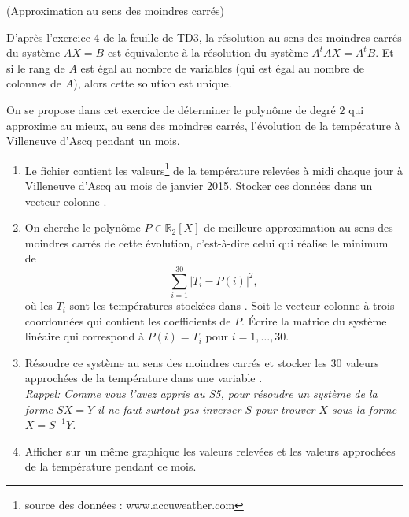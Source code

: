 \documentclass[a4paper,12pt,reqno]{amsart}
\begin{document}
\begin{exo} (Approximation au sens des moindres carrés)

  D'après l'exercice 4 de la feuille de TD3, la résolution au sens des moindres carrés du système $AX=B$ est équivalente à la résolution du système $A^{t}AX=A^{t}B$. Et si le rang de $A$ est égal au nombre de variables (qui est égal au nombre de colonnes de $A$), alors cette solution est unique.

  On se propose dans cet exercice de déterminer le polynôme de degré $2$ qui approxime au mieux, au sens des moindres carrés, l'évolution de la température à Villeneuve d'Ascq pendant un mois.

  \begin{enumerate}
    \item Le fichier  contient les valeurs\footnote{source des données : www.accuweather.com} de la température relevées à midi chaque jour à Villeneuve d’Ascq au mois de janvier 2015. Stocker ces données dans un vecteur colonne .

    \item On cherche le polynôme $P \in \mathbb{R}_{2}[X]$ de meilleure approximation au sens des moindres carrés de cette évolution, c'est-à-dire celui qui réalise le minimum de
    $$
      \sum_{i=1}^{30} |T_{i}-P(i)|^2,
    $$
    où les $T_{i}$ sont les températures stockées dans .
    Soit  le vecteur colonne à trois coordonnées qui contient les coefficients de $P$.
    Écrire la matrice  du système linéaire  qui correspond à $P(i)=T_{i}$ pour $i=1,\ldots,30$.

    \item Résoudre ce système au sens des moindres carrés et stocker les $30$ valeurs approchées de la température dans une variable .\\
    \textit{Rappel: Comme vous l'avez appris au \textup{S5}, pour résoudre un système de la forme $SX=Y$ il ne faut surtout pas inverser $S$ pour trouver $X$ sous la forme $X = S^{-1}Y$.}

    \item Afficher sur un même graphique les valeurs relevées et les valeurs approchées de la température pendant ce mois.
  \end{enumerate}

\end{exo}

\end{document}

